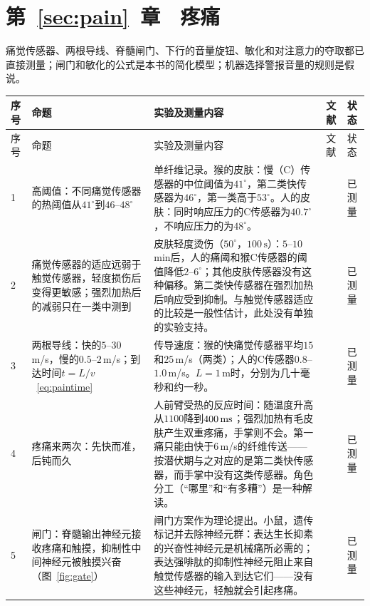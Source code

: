 \section{第~\ref{sec:pain}~章　疼痛}

痛觉传感器、两根导线、脊髓闸门、下行的音量旋钮、敏化和对注意力的夺取都已直接测量；闸门和敏化的公式是本书的简化模型；机器选择警报音量的规则是假说。

{\footnotesize
\setlength{\tabcolsep}{3pt}\renewcommand{\arraystretch}{1.15}
\begin{longtable}{>{\raggedright}p{0.5cm}>{\raggedright}p{4.0cm}>{\raggedright}p{5.6cm}>{\raggedright}p{2.3cm}>{\raggedright\arraybackslash}p{1.7cm}}
\toprule
序号 & 命题 & 实验及测量内容 & 文献 & 状态 \\
\midrule\endfirsthead
\toprule
序号 & 命题 & 实验及测量内容 & 文献 & 状态 \\
\midrule\endhead
1 & 高阈值：不同痛觉传感器的热阈值从$41^\circ$到$46$--$48^\circ$ & 单纤维记录。猴的皮肤：慢（C）传感器的中位阈值为$41^\circ$，第二类快传感器为$46^\circ$，第一类高于$53^\circ$。人的皮肤：同时响应压力的C传感器为$40.7^\circ$，不响应压力的为$48^\circ$。 & \cite{Treede1995heat, Weidner1999cfib} & 已测量 \\
2 & 痛觉传感器的适应远弱于触觉传感器，轻度损伤后变得更敏感；强烈加热后的减弱只在一类中测到 & 皮肤轻度烫伤（$50^\circ$，$100\,\text{s}$）：$5$--$10$\,min后，人的痛阈和猴C传感器的阈值降低$2$--$6^\circ$；其他皮肤传感器没有这种偏移。第二类快传感器在强烈加热后响应受到抑制。与触觉传感器适应的比较是一般性估计，此处没有单独的实验支持。 & \cite{LaMotte1982hyper, Treede1995heat} & 已测量 \\
3 & 两根导线：快的$5$--$30$\,m/s，慢的$0.5$--$2$\,m/s；到达时间$t=L/v$~\eqref{eq:paintime} & 传导速度：猴的快痛觉传感器平均$15$和$25$\,m/s（两类）；人的C传感器$0.8$--$1.0$\,m/s。$L=1$\,m时，分别为几十毫秒和约一秒。 & \cite{Treede1995heat, Weidner1999cfib} & 已测量 \\
4 & 疼痛来两次：先快而准，后钝而久 & 人前臂受热的反应时间：随温度升高从$1100$降到$400\,\text{ms}$；强烈加热有毛皮肤产生双重疼痛，手掌则不会。第一痛只能由快于$6$\,m/s的纤维传送——按潜伏期与之对应的是第二类快传感器，而手掌中没有这类传感器。角色分工（“哪里”和“有多糟”）是一种解读。 & \cite{CampbellLaMotte1983first, Treede1995heat} & 已测量 \\
5 & 闸门：脊髓输出神经元接收疼痛和触摸，抑制性中间神经元被触摸兴奋（图~\ref{fig:gate}） & 闸门方案作为理论提出。小鼠，遗传标记并去除神经元群：表达生长抑素的兴奋性神经元是机械痛所必需的；表达强啡肽的抑制性神经元阻止来自触觉传感器的输入到达它们——没有这些神经元，轻触就会引起疼痛。 & \cite{MelzackWall1965, Duan2014} & 已测量 \\

\end{longtable}}
